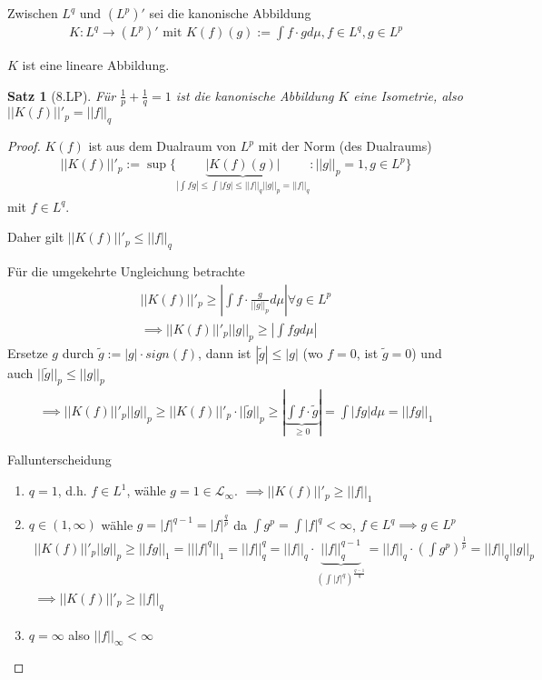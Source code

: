 \documentclass[]{article}
\newtheorem{theorem}{Satz}
\begin{document}
Zwischen $L^q$ und $(L^p)'$ sei die kanonische Abbildung
\begin{align*}
	K:L^q \rightarrow (L^p)' \text{ mit } K(f)(g) := \int f\cdot g d\mu, f\in L^q, g \in L^p
\end{align*}

$K$ ist eine lineare Abbildung.

\begin{theorem}[8.LP]
	Für $\frac{1}{p} + \frac{1}{q} = 1$ ist die kanonische Abbildung $K$ eine Isometrie, also $||K(f)||'_p = ||f||_q$
\end{theorem}

\begin{proof}
	$K(f)$ ist aus dem Dualraum von $L^p$ mit der Norm (des Dualraums)
	\begin{align*}
		||K(f)||'_p := \sup \{\underbrace{|K(f)(g)|}_{|\int fg| \leq \int |fg| \leq ||f||_q ||g||_p = ||f||_q} : ||g||_p=1, g \in L^p\}
	\end{align*}
	mit $f \in L^q$.
	
	Daher gilt $||K(f)||'_p \leq ||f||_q$
	
	Für die umgekehrte Ungleichung betrachte
	\begin{align*}
		||K(f)||'_p \geq |\int f \cdot \frac{g}{||g||_p} d\mu| \forall g \in L^p\\
		\implies ||K(f)||'_p ||g||_p \geq |\int fgd\mu|
	\end{align*}
	Ersetze $g$ durch $\tilde{g}:= |g|\cdot sign(f)$, dann ist $|\tilde{g}| \leq |g|$ (wo $f=0$, ist $\tilde{g}=0$) und auch $||\tilde{g}||_p \leq ||g||_p$
	\begin{align*}
		\implies ||K(f)||'_p ||g||_p \geq ||K(f)||'_p \cdot ||\tilde{g}||_p \geq |\underbrace{\int f\cdot \tilde{g}}_{\geq 0}| = \int |fg| d\mu = ||fg||_1
	\end{align*}
	
	Fallunterscheidung
	\begin{enumerate}
		\item $q=1$, d.h. $f\in L^1$, wähle $g=1\in \mathcal{L}_\infty$. $\implies ||K(f)||'_p \geq ||f||_1$
		\item $q\in(1,\infty)$ wähle $g=|f|^{q-1} = |f|^{\frac{q}{p}}$ da $\int g^p = \int |f|^q < \infty$, $f\in L^q \implies g\in L^p$
		\begin{align*}
			||K(f)||'_p ||g||_p \geq ||fg||_1 = || |f|^q ||_1 = ||f||_q^q = ||f||_q \cdot \underbrace{||f||_q^{q-1}}_{(\int |f|^q)^{\frac{q-1}{q}}} = ||f||_q \cdot (\int g^p)^{\frac{1}{p}} = ||f||_q ||g||_p\\
			\implies ||K(f)||'_p \geq ||f||_q
		\end{align*}
		\item $q=\infty$ also $||f||_\infty < \infty$
		

\end{enumerate}
\end{proof}
\end{document}
